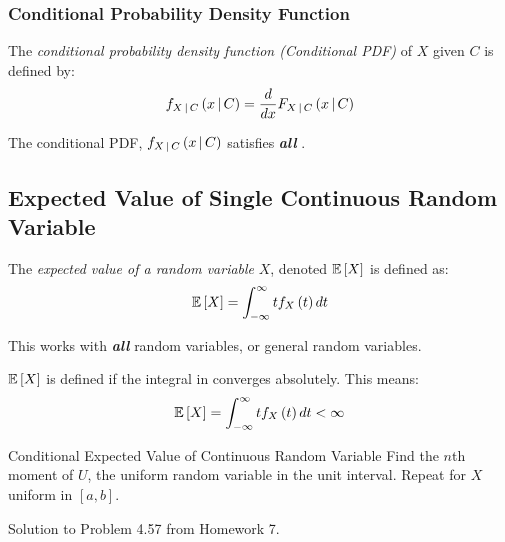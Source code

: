 \subsubsection{Conditional Probability Density Function}\label{subsubsec:Conditional Probability Density Function}
\begin{definition}\label{def:Conditional Probability Density Function}
  The \emph{conditional probability density function (Conditional PDF)} of $X$ given $C$ is defined by:
  \begin{equation}\label{eq:Conditional Probability Density Function}
    f_{X \operatorname{\vert} C} \left( x \operatorname{\vert} C \right) = \frac{d}{dx} F_{X \operatorname{\vert} C} \left( x \operatorname{\vert} C \right)
  \end{equation}
  \begin{remark}
    The conditional PDF, $f_{X \operatorname{\vert} C} \left( x \operatorname{\vert} C \right)$ satisfies \emph{\textbf{all}} .
  \end{remark}
\end{definition}

\subsection{Expected Value of Single Continuous Random Variable}\label{subsec:Expected Value of Single Continuous}
\begin{definition}\label{def:Expected Value of Single Continuous}
  The \emph{expected value of a random variable} $X$, denoted $\operatorname{\operatorname{\mathbb{E}}} \left[ X \right]$ is defined as:
  \begin{equation}\label{eq:Expected Value of Single Continuous}
    \operatorname{\operatorname{\mathbb{E}}} \left[ X \right] = \int_{-\infty}^{\infty} t f_{X} \left( t \right) dt
  \end{equation}
  \begin{remark}
    This works with \emph{\textbf{all}} random variables, or general random variables.
  \end{remark}
  \begin{remark}
    $\operatorname{\operatorname{\mathbb{E}}} \left[ X \right]$ is defined if the integral in  converges absolutely.
    This means:
    \begin{equation*}
      \operatorname{\operatorname{\mathbb{E}}} \left[ X \right] = \int_{-\infty}^{\infty} t f_{X} \left( t \right) dt < \infty
    \end{equation*}
  \end{remark}
\end{definition}
\begin{example}[Problem 4.57]{Conditional Expected Value of Continuous Random Variable}
  Find the $n$th moment of $U$, the uniform random variable in the unit interval.
  Repeat for $X$ uniform in $\left[ a,b \right]$.

  \tcblower

  Solution to Problem 4.57 from Homework 7.
\end{example}

